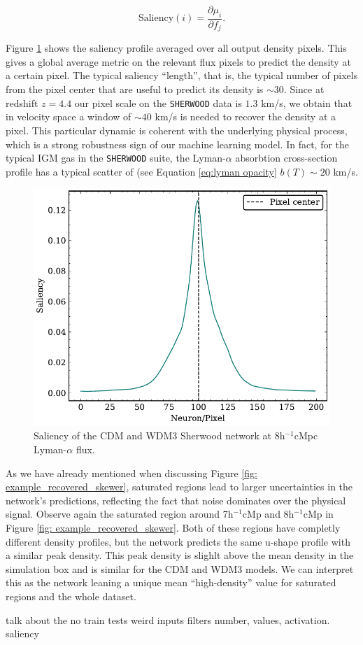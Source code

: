 \begin{equation}
    \text{Saliency}(i) = \frac{\partial  \mu_i}{\partial f_j}.
\end{equation}

Figure \ref{fig: saliency} shows the saliency profile averaged over all output density pixels. This gives a global average metric on the relevant flux pixels to predict the density at a certain pixel. The typical saliency ``length'', that is, the typical number of pixels from the pixel center that are useful to predict its density is $\sim 30$. Since at redshift $z=4.4$ our pixel scale on the \texttt{SHERWOOD} data is $1.3$ km/s, we obtain that in velocity space a window of $\sim 40$ km/s is needed to recover the density at a pixel. This particular dynamic is coherent with the underlying physical process, which is a strong robustness sign of our machine learning model. In fact, for the typical IGM gas in the \texttt{SHERWOOD} suite, the Lyman-$\alpha$ absorbtion cross-section profile has a typical scatter of (see Equation \ref{eq:lyman opacity} $ b(T) \sim 20$ km/s.


\begin{figure}
    \centering
    \includegraphics[width=0.6\linewidth]{img/ML/saliency.pdf}
    \caption{Saliency of the CDM and WDM3 Sherwood network at 8h$^{-1}$cMpc Lyman-$\alpha$ flux.}
    \label{fig: saliency}
\end{figure}



As we have already mentioned when discussing Figure \ref{fig: example_recovered_skewer}, saturated regions lead to larger uncertainties in the network's predictions, reflecting the fact that noise dominates over the physical signal. Observe again the saturated region around 7h$^{-1}$cMp and 8h$^{-1}$cMp in Figure \ref{fig: example_recovered_skewer}. Both of these regions have completly different density profiles, but the network predicts the same u-shape profile with a similar peak density. This peak density is slighlt above the mean density in the simulation box and is similar for the CDM and WDM3 models. We can interpret this as the network leaning a unique mean ``high-density'' value for saturated regions and the whole dataset.



talk about the no train tests
weird inputs
filters number, values, activation.
saliency






